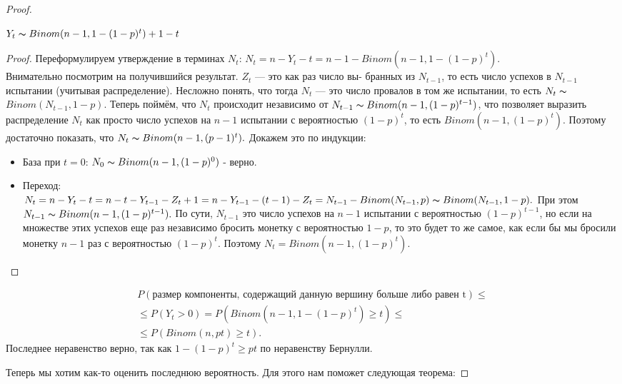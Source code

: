 \begin{proof}
\begin{proposition}
    $Y_t \thicksim Binom(n-1, 1-(1-p)^t) + 1 -t$
\end{proposition}

\begin{proof}
Переформулируем утверждение в терминах $N_t$:
    $N_t = n - Y_t - t = n-1-Binom(n-1, 1-(1-p)^t)$. \\Внимательно посмотрим на получившийся результат. $Z_t$ — это как раз число вы- бранных из $N_{t-1}$, то есть число успехов в $N_{t-1}$ испытании (учитывая распределение). Несложно понять, что тогда $N_t$ — это число провалов в том же испытании, то есть $N_t \thicksim$ $Binom(N_{t-1}, 1 - p)$. Теперь поймём, что $N_t$ происходит независимо от $N_{t-1} \thicksim Binom(n-1, (1-p)^{t-1})$, что позволяет выразить распределение $N_t$ как просто число успехов на $n-1$ испытании с вероятностью $(1-p)^t$, то есть $Binom(n-1, (1-p)^{t})$.
    Поэтому достаточно показать, что $N_t \thicksim Binom(n-1, (p-1)^t).$ Докажем это по индукции: \\
    \begin{itemize}
        \item База при $t=0$: $N_0 \thicksim Binom(n-1, (1-p)^0)$ - верно.
        \item Переход:\\
        $N_t = n-Y_t-t=n-t-Y_{t-1}-Z_t+1 = n - Y_{t-1}-(t-1)-Z_t=N_{t-1} - Binom(N_{t-1}, p) \thicksim Binom(N_{t-1},1-p).$ При этом $N_{t-1} \thicksim Binom(n-1, (1-p)^{t-1}).$ 
        По сути, $N_{t-1}$ это число успехов на $n-1$ испытании с вероятностью $(1-p)^{t-1}$, но если на множестве этих успехов еще раз независимо бросить монетку с вероятностью $1-p$, то это будет то же самое, как если бы мы бросили монетку $n-1$ раз с вероятностью $(1-p)^t$.
        Поэтому $N_t = Binom(n-1, (1-p)^t)$.
    \end{itemize}
\end{proof}


\begin{multline*}
P(\text{размер компоненты, содержащий данную вершину больше либо равен t})\leq \\ \leq P(Y_t > 0) = 
P(Binom(n-1, 1-(1-p)^{t}) \geq t)\leq \\\leq P(Binom(n, pt) \geq t). 
\end{multline*}
Последнее неравенство верно, так как $1-(1-p)^t \geq pt$ по неравенству Бернулли.

Теперь мы хотим как-то оценить последнюю вероятность. Для этого нам поможет следующая теорема:


\end{proof}
